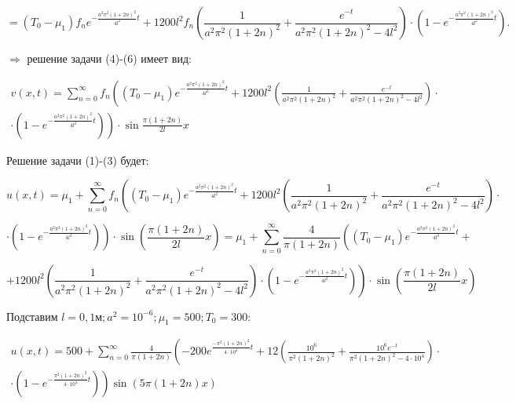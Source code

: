 $$ = (T_{0} - \mu_{1})f_{n}e^{-\frac{a^{2}\pi^{2}(1 + 2n)^{2}}{4l^{2}}t} + 1200l^{2}f_{n}\left( \frac{1}{a^{2}\pi^{2}(1 + 2n)^{2}} + \frac{e^{-t}}{a^{2}\pi^{2}(1 + 2n)^{2} - 4l^{2}} \right) \cdot (1 - e^{-\frac{a^{2}\pi^{2}(1 + 2n)^{2}}{4l^{2}}t}).$$

$\Rightarrow$ решение задачи (4)-(6) имеет вид:

\begin{multline*}
v(x, t) = \sum_{n=0}^{\infty}f_{n} \left( (T_{0} - \mu_{1})e^{-\frac{a^{2}\pi^{2}(1 + 2n)^{2}}{4l^{2}}t} + 1200l^{2} \left( \frac{1}{a^{2}\pi^{2}(1 + 2n)^{2}} + \frac{e^{-t}}{a^{2}\pi^{2}(1 + 2n)^{2} - 4l^{2}} \right) \cdot \right. \\ 
\left. \cdot \left( 1 - e^{-\frac{a^{2}\pi^{2}(1 + 2n)^{2}}{4l^{2}}t} \right) \right) \cdot \sin {\frac{\pi(1 + 2n)}{2l}x}
\end{multline*}

Решение задачи (1)-(3) будет:

$$u(x, t) = \mu_{1} + \sum_{n=0}^{\infty}f_{n} \left( (T_{0} - \mu_{1})e^{-\frac{a^{2}\pi^{2}(1 + 2n)^{2}}{4l^{2}}t} + 1200l^{2} \left( \frac{1}{a^{2}\pi^{2}(1 + 2n)^{2}} + \frac{e^{-t}}{a^{2}\pi^{2}(1 + 2n)^{2} - 4l^{2}} \right) \cdot \right.$$

$$\left. \cdot \left( 1 - e^{-\frac{a^{2}\pi^{2}(1 + 2n)^{2}}{4l^{2}}t} \right) \right) \cdot \sin \left( {\frac{\pi(1 + 2n)}{2l}x} \right) = \mu_{1} + \sum_{n=0}^{\infty} \frac{4}{\pi(1 + 2n)} \left( (T_{0} - \mu_{1})e^{-\frac{a^{2}\pi^{2}(1 + 2n)^{2}}{4l^{2}}t} + \right. $$

$$ \left. + 1200l^{2} \left( \frac{1}{a^{2}\pi^{2}(1 + 2n)^{2}} + \frac{e^{-t}}{a^{2}\pi^{2}(1 + 2n)^{2} - 4l^{2}} \right) \cdot \left( 1 - e^{-\frac{a^{2}\pi^{2}(1 + 2n)^{2}}{4l^{2}}t} \right) \right) \cdot \sin \left( {\frac{\pi(1 + 2n)}{2l}x} \right)$$

Подставим $l = 0,1 \text{м}; a^{2} = 10^{-6}; \mu_{1} = 500; T_{0} = 300$:

\begin{multline*}
u(x, t) = 500 + \sum_{n=0}^{\infty} \frac{4}{\pi(1 + 2n)} \left( -200e^{\frac{-\pi^{2}(1 + 2n)^{2}}{4 \cdot 10^{4}}t} + 12 \left( \frac{10^{6}}{\pi^{2}(1 + 2n)^{2}} + \frac{10^{6}e^{-t}}{\pi^{2}(1 + 2n)^{2} - 4 \cdot 10^{4}} \right) \cdot \right. \\
\left. \cdot \left( 1 - e^{-\frac{\pi^{2}(1 + 2n)^{2}}{4 \cdot 10^{4}}t} \right)\right) \sin{(5\pi(1 + 2n)x)} \end{multline*}

\pagebreak

